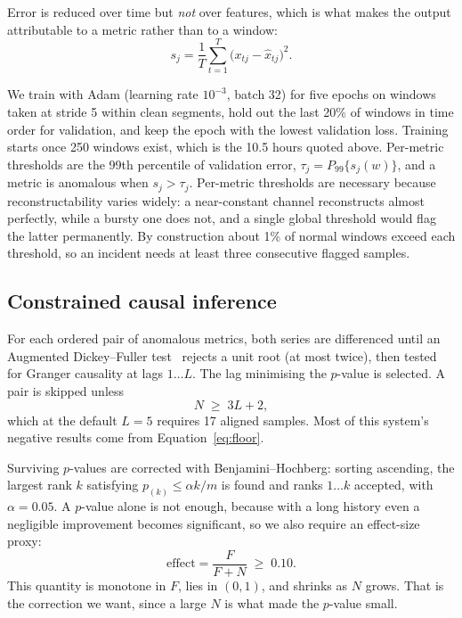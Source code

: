 \documentclass[conference,a4paper]{IEEEtran}
\begin{document}
Error is reduced over time but \emph{not} over features, which is what makes
the output attributable to a metric rather than to a window:
\begin{equation}
s_j = \frac{1}{T}\sum_{t=1}^{T}\bigl(x_{tj}-\hat{x}_{tj}\bigr)^2 .
\end{equation}

We train with Adam (learning rate $10^{-3}$, batch 32) for five epochs on
windows taken at stride 5 within clean segments, hold out the last 20\% of
windows in time order for validation, and keep the epoch with the lowest
validation loss. Training starts once 250 windows exist, which is the
10.5 hours quoted above. Per-metric thresholds are the 99th percentile of
validation error,
$\tau_j = P_{99}\{s_j(w)\}$, and a metric is anomalous when $s_j > \tau_j$.
Per-metric thresholds are necessary because reconstructability varies widely:
a near-constant channel reconstructs almost perfectly, while a bursty one does
not, and a single global threshold would flag the latter permanently. By
construction about 1\% of normal windows exceed each threshold, so an
incident needs at least three consecutive flagged samples.

\subsection{Constrained causal inference}

For each ordered pair of anomalous metrics, both series are differenced until
an Augmented Dickey--Fuller test~\cite{dickey1979distribution} rejects a unit
root (at most twice), then
tested for Granger causality at lags $1\ldots L$. The lag minimising the
$p$-value is selected. A pair is skipped unless
\begin{equation}
N \;\ge\; 3L + 2 ,
\label{eq:floor}
\end{equation}
which at the default $L=5$ requires 17 aligned samples. Most of this
system's negative results come from Equation~\eqref{eq:floor}.

Surviving $p$-values are corrected with Benjamini--Hochberg: sorting ascending,
the largest rank $k$ satisfying $p_{(k)} \le \alpha k / m$ is found and ranks
$1\ldots k$ accepted, with $\alpha = 0.05$. A $p$-value alone is not enough,
because with a long history even a negligible improvement becomes significant,
so we also require an effect-size proxy:
\begin{equation}
\mathrm{effect} = \frac{F}{F+N} \;\ge\; 0.10 .
\end{equation}
This quantity is monotone in $F$, lies in $(0,1)$, and shrinks as $N$ grows.
That is the correction we want, since a large $N$ is what made the $p$-value
small.
\end{document}
